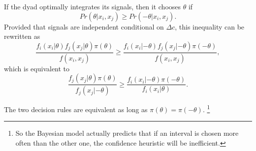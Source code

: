 \documentclass[12pt]{article}
\begin{document}
If the dyad optimally integrates its signals, then it chooses $\theta$ if $$ Pr(\theta|x_i,x_j) \geq Pr(-\theta|x_i,x_j).$$ Provided that signals are independent conditional on $\Delta c$, this inequality can be rewritten as $$\frac{f_i(x_i|\theta) f_j(x_j|\theta)\pi(\theta)}{f(x_i,x_j)} \geq\frac{f_i(x_i|-\theta) f_j(x_j|-\theta)\pi(-\theta)}{f(x_i,x_j)}, $$ which is equivalent to $$\frac{ f_j(x_j|\theta)\pi(\theta)}{f_j(x_j|-\theta)} \geq\frac{ f_i(x_i|-\theta)\pi(-\theta)}{f_i(x_i|\theta)}.$$

The two decision rules are equivalent as long as $\pi(\theta)=\pi(-\theta)$. \footnote{So the Bayesian model actually predicts that if an interval is chosen more often than the other one, the confidence heuristic will be inefficient.}








 
\end{document}
